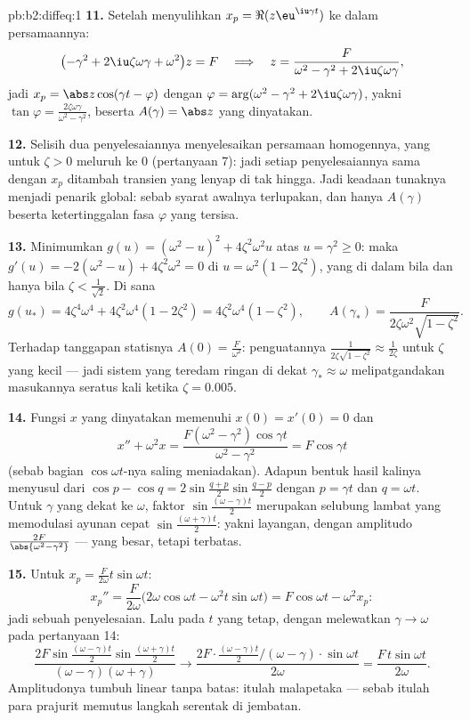 \begin{solution}{pb:b2:diffeq:1}
\textbf{11.} Setelah menyulihkan $x_p = \Re(z\eu^{\iu\gamma t})$ ke dalam
persamaannya:
\[
\bigl(-\gamma^2 + 2\iu\zeta\omega\gamma +
\omega^2\bigr)z = F
\quad\Longrightarrow\quad
z = \frac{F}{\omega^2 - \gamma^2 + 2\iu\zeta\omega\gamma},
\]
jadi $x_p = \abs z\cos(\gamma t - \varphi)$ dengan $\varphi =
\arg(\omega^2 - \gamma^2 + 2\iu\zeta\omega\gamma)$, yakni
$\tan\varphi = \frac{2\zeta\omega\gamma}{\omega^2 -
\gamma^2}$, beserta $A(\gamma) = \abs z$ yang dinyatakan.

\textbf{12.} Selisih dua penyelesaiannya menyelesaikan persamaan
homogennya, yang untuk $\zeta > 0$ meluruh ke $0$
(pertanyaan 7): jadi setiap penyelesaiannya sama dengan $x_p$ ditambah transien
yang lenyap di tak hingga. Jadi keadaan tunaknya menjadi penarik global:
sebab syarat awalnya terlupakan, dan hanya $A(\gamma)$ beserta
ketertinggalan fasa $\varphi$ yang tersisa.

\textbf{13.} Minimumkan $g(u) = (\omega^2 - u)^2 +
4\zeta^2\omega^2u$ atas $u = \gamma^2 \geq 0$: maka $g'(u) =
-2(\omega^2 - u) + 4\zeta^2\omega^2 = 0$ di $u = \omega^2(1 -
2\zeta^2)$, yang di dalam bila dan hanya bila $\zeta < \frac{1}{\sqrt2}$. Di sana
\[
g(u_*) = 4\zeta^4\omega^4 + 4\zeta^2\omega^4(1 - 2\zeta^2)
= 4\zeta^2\omega^4(1 - \zeta^2),
\qquad
A(\gamma_*) = \frac{F}{2\zeta\omega^2\sqrt{1 - \zeta^2}} .
\]
Terhadap tanggapan statisnya $A(0) = \frac{F}{\omega^2}$:
penguatannya $\frac{1}{2\zeta\sqrt{1-\zeta^2}} \approx
\frac{1}{2\zeta}$ untuk $\zeta$ yang kecil --- jadi sistem yang teredam ringan
di dekat $\gamma_* \approx \omega$ melipatgandakan masukannya
seratus kali ketika $\zeta = 0.005$.

\textbf{14.} Fungsi $x$ yang dinyatakan memenuhi $x(0) = x'(0) = 0$ dan
\[
x'' + \omega^2 x = \frac{F(\omega^2 -
\gamma^2)\cos\gamma t}{\omega^2 - \gamma^2} = F\cos\gamma t
\]
(sebab bagian $\cos\omega t$-nya saling meniadakan). Adapun bentuk hasil kalinya menyusul
dari $\cos p - \cos q = 2\sin\frac{q+p}{2}\sin\frac{q-p}2$
dengan $p = \gamma t$ dan $q = \omega t$. Untuk $\gamma$ yang dekat ke
$\omega$, faktor $\sin\frac{(\omega-\gamma)t}2$ merupakan selubung
lambat yang memodulasi ayunan cepat
$\sin\frac{(\omega+\gamma)t}2$: yakni layangan, dengan amplitudo
$\frac{2F}{\abs{\omega^2-\gamma^2}}$ --- yang besar, tetapi terbatas.

\textbf{15.} Untuk $x_p = \frac{F}{2\omega}t\sin\omega t$:
\[
x_p'' = \frac{F}{2\omega}\bigl(2\omega\cos\omega t -
\omega^2t\sin\omega t\bigr)
= F\cos\omega t - \omega^2x_p :
\]
jadi sebuah penyelesaian. Lalu pada $t$ yang tetap, dengan melewatkan $\gamma \to \omega$ pada
pertanyaan 14:
\[
\frac{2F\sin\frac{(\omega-\gamma)t}2
\sin\frac{(\omega+\gamma)t}{2}}
{(\omega-\gamma)(\omega+\gamma)}
\longrightarrow
\frac{2F\cdot\frac{(\omega-\gamma)t}2\big/(\omega-\gamma)
\cdot\sin\omega t}{2\omega}
= \frac{F\,t\sin\omega t}{2\omega} .
\]
Amplitudonya tumbuh linear tanpa batas: itulah malapetaka
 --- sebab itulah para prajurit memutus langkah serentak di jembatan.


\end{solution}
